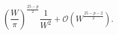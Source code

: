 \begin{equation}\label{eq:SmallWIntegrand}
   \left(\frac{W}{\pi}\right)^{\tfrac{25-p}{2}} \frac{1}{W^2}
+\mathcal{O}(W^{\tfrac{25-p-2}{2}}).
\end{equation}

